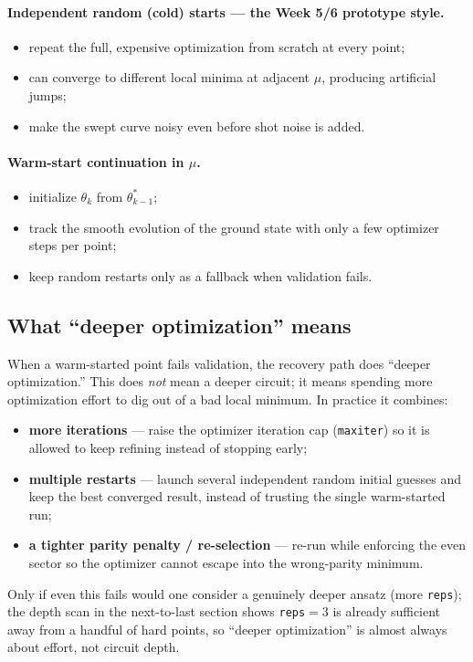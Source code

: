 \documentclass[11pt]{article}
\begin{document}
\paragraph{Independent random (cold) starts --- the Week 5/6 prototype style.}
\begin{itemize}
  \item repeat the full, expensive optimization from scratch at every point;
  \item can converge to different local minima at adjacent $\mu$, producing artificial jumps;
  \item make the swept curve noisy even before shot noise is added.
\end{itemize}

\paragraph{Warm-start continuation in $\mu$.}
\begin{itemize}
  \item initialize $\theta_k$ from $\theta_{k-1}^{*}$;
  \item track the smooth evolution of the ground state with only a few optimizer steps per point;
  \item keep random restarts only as a fallback when validation fails.
\end{itemize}

\subsection*{What ``deeper optimization'' means}

When a warm-started point fails validation, the recovery path does ``deeper optimization.'' This does \emph{not} mean a deeper circuit; it means spending more optimization effort to dig out of a bad local minimum. In practice it combines:
\begin{itemize}
  \item \textbf{more iterations} --- raise the optimizer iteration cap (\texttt{maxiter}) so it is allowed to keep refining instead of stopping early;
  \item \textbf{multiple restarts} --- launch several independent random initial guesses and keep the best converged result, instead of trusting the single warm-started run;
  \item \textbf{a tighter parity penalty / re-selection} --- re-run while enforcing the even sector so the optimizer cannot escape into the wrong-parity minimum.
\end{itemize}
Only if even this fails would one consider a genuinely deeper ansatz (more \texttt{reps}); the depth scan in the next-to-last section shows \texttt{reps}$=3$ is already sufficient away from a handful of hard points, so ``deeper optimization'' is almost always about effort, not circuit depth.
\end{document}
